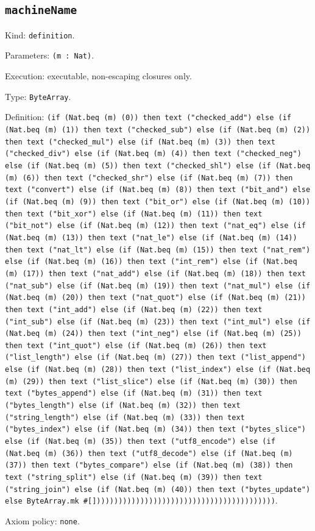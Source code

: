 \documentclass[11pt]{article}
\begin{document}
\subsection*{\texttt{machineName}}
\noindent Kind: \texttt{definition}.\par
\noindent Parameters: \texttt{(m : Nat)}.\par
\noindent Execution: executable, non-escaping closures only.\par
\noindent Type: \texttt{ByteArray}.\par
\noindent Definition: \texttt{(if (Nat.beq (m) (0)) then text ("checked\_add") else (if (Nat.beq (m) (1)) then text ("checked\_sub") else (if (Nat.beq (m) (2)) then text ("checked\_mul") else (if (Nat.beq (m) (3)) then text ("checked\_div") else (if (Nat.beq (m) (4)) then text ("checked\_neg") else (if (Nat.beq (m) (5)) then text ("checked\_shl") else (if (Nat.beq (m) (6)) then text ("checked\_shr") else (if (Nat.beq (m) (7)) then text ("convert") else (if (Nat.beq (m) (8)) then text ("bit\_and") else (if (Nat.beq (m) (9)) then text ("bit\_or") else (if (Nat.beq (m) (10)) then text ("bit\_xor") else (if (Nat.beq (m) (11)) then text ("bit\_not") else (if (Nat.beq (m) (12)) then text ("nat\_eq") else (if (Nat.beq (m) (13)) then text ("nat\_le") else (if (Nat.beq (m) (14)) then text ("nat\_lt") else (if (Nat.beq (m) (15)) then text ("nat\_rem") else (if (Nat.beq (m) (16)) then text ("int\_rem") else (if (Nat.beq (m) (17)) then text ("nat\_add") else (if (Nat.beq (m) (18)) then text ("nat\_sub") else (if (Nat.beq (m) (19)) then text ("nat\_mul") else (if (Nat.beq (m) (20)) then text ("nat\_quot") else (if (Nat.beq (m) (21)) then text ("int\_add") else (if (Nat.beq (m) (22)) then text ("int\_sub") else (if (Nat.beq (m) (23)) then text ("int\_mul") else (if (Nat.beq (m) (24)) then text ("int\_neg") else (if (Nat.beq (m) (25)) then text ("int\_quot") else (if (Nat.beq (m) (26)) then text ("list\_length") else (if (Nat.beq (m) (27)) then text ("list\_append") else (if (Nat.beq (m) (28)) then text ("list\_index") else (if (Nat.beq (m) (29)) then text ("list\_slice") else (if (Nat.beq (m) (30)) then text ("bytes\_append") else (if (Nat.beq (m) (31)) then text ("bytes\_length") else (if (Nat.beq (m) (32)) then text ("string\_length") else (if (Nat.beq (m) (33)) then text ("bytes\_index") else (if (Nat.beq (m) (34)) then text ("bytes\_slice") else (if (Nat.beq (m) (35)) then text ("utf8\_encode") else (if (Nat.beq (m) (36)) then text ("utf8\_decode") else (if (Nat.beq (m) (37)) then text ("bytes\_compare") else (if (Nat.beq (m) (38)) then text ("string\_split") else (if (Nat.beq (m) (39)) then text ("string\_join") else (if (Nat.beq (m) (40)) then text ("bytes\_update") else ByteArray.mk \#[])))))))))))))))))))))))))))))))))))))))))}.\par
\noindent Axiom policy: \texttt{none}.\par
\end{document}
